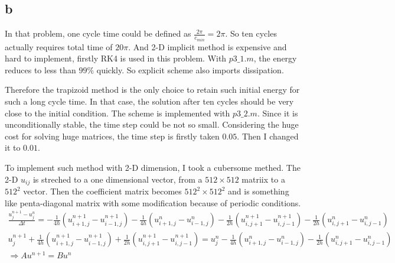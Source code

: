 \documentclass[letterpaper,10pt]{article}
\begin{document}
\subsection{b}
In that problem, one cycle time could be defined as $\frac{2\pi}{c_{min}}=2\pi$. So ten cycles actually requires total time of $20\pi$. 
And 2-D implicit method is expensive and hard to implement, firstly RK4 is used in this problem. With $p3\_1.m$, the energy reduces to less than $99\%$ quickly. 
So explicit scheme also imports dissipation. 

Therefore the trapizoid method is the only choice to retain such initial energy for such a long cycle time. In that case, 
the solution after ten cycles should be very close to the initial condition. The scheme is implemented with $p3\_2.m$. Since it is unconditionally stable, 
the time step could be not so small. Considering the huge cost for solving huge matrices, the time step is firstly taken $0.05$. Then I changed it to 
$0.01$. 

To implement such method with 2-D dimension, I took a cubersome methed. The 2-D $u_{ij}$ is streched to a one dimensional vector, from a $512\times 512$ matriix 
to a $512^2$ vector. Then the coefficient matrix becomes $512^2\times 512^2$ and is something like penta-diagonal matrix with some modification because of 
periodic conditions. 
\begin{align*}
  \frac{u_j^{n+1}-u_j^n}{\Delta t}=-\frac{1}{4h}\left(u^{n+1}_{i+1,j}-u^{n+1}_{i-1,j}\right)-\frac{1}{4h}\left(u^{n}_{i+1,j}-u^{n}_{i-1,j}\right)
  -\frac{1}{2h}\left(u^{n+1}_{i,j+1}-u^{n+1}_{i,j-1}\right)-\frac{1}{2h}\left(u^{n}_{i,j+1}-u^{n}_{i,j-1}\right)&\\
  u_j^{n+1}+\frac{1}{4h}\left(u^{n+1}_{i+1,j}-u^{n+1}_{i-1,j}\right)+\frac{1}{2h}\left(u^{n+1}_{i,j+1}-u^{n+1}_{i,j-1}\right)=
  u_j^n-\frac{1}{4h}\left(u^{n}_{i+1,j}-u^{n}_{i-1,j}\right)-\frac{1}{2h}\left(u^{n}_{i,j+1}-u^{n}_{i,j-1}\right)&\\
  \Rightarrow A u^{n+1} = B u^n&
\end{align*}
\end{document}

